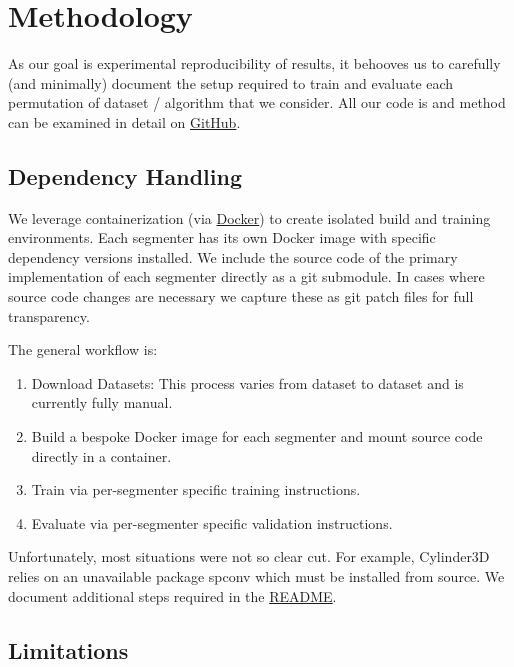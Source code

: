 \section{Methodology}
\label{chap:methodology}

As our goal is experimental reproducibility of results, it behooves us to carefully (and minimally) document the setup required to train and evaluate each permutation of dataset / algorithm that we consider. All our code is and method can be examined in detail on \href{https://github.com/danielmohansahu/benchmarking-3d-semantic-segmentation}{GitHub}.

\subsection{Dependency Handling}
\label{dependency-handling}

We leverage containerization (via \href{https://www.docker.com/}{Docker}) to create isolated build and training environments. Each segmenter has its own Docker image with specific dependency versions installed. We include the source code of the primary implementation of each segmenter directly as a git submodule. In cases where source code changes are necessary we capture these as git patch files for full transparency.

The general workflow is:
\begin{enumerate}
  \item Download Datasets: This process varies from dataset to dataset and is currently fully manual.
  \item Build a bespoke Docker image for each segmenter and mount source code directly in a container.
  \item Train via per-segmenter specific training instructions.
  \item Evaluate via per-segmenter specific validation instructions.
\end{enumerate}

Unfortunately, most situations were not so clear cut. For example, Cylinder3D relies on an unavailable package spconv which must be installed from source. We document additional steps required in the \href{https://github.com/danielmohansahu/benchmarking-3d-semantic-segmentation/blob/main/README.md}{README}.

\subsection{Limitations}
\label{limitations}

